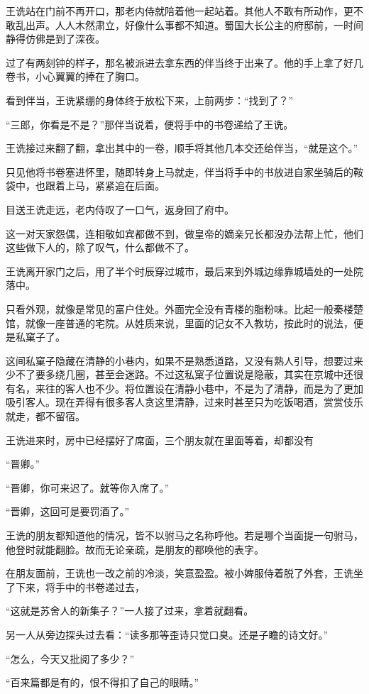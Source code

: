 王诜站在门前不再开口，那老内侍就陪着他一起站着。其他人不敢有所动作，更不敢乱出声。人人木然肃立，好像什么事都不知道。蜀国大长公主的府邸前，一时间静得仿佛是到了深夜。

过了有两刻钟的样子，那名被派进去拿东西的伴当终于出来了。他的手上拿了好几卷书，小心翼翼的捧在了胸口。

看到伴当，王诜紧绷的身体终于放松下来，上前两步：“找到了？”

“三郎，你看是不是？”那伴当说着，便将手中的书卷递给了王诜。

王诜接过来翻了翻，拿出其中的一卷，顺手将其他几本交还给伴当，“就是这个。”

只见他将书卷塞进怀里，随即转身上马就走，伴当将手中的书放进自家坐骑后的鞍袋中，也跟着上马，紧紧追在后面。

目送王诜走远，老内侍叹了一口气，返身回了府中。

这一对天家怨偶，连相敬如宾都做不到，做皇帝的嫡亲兄长都没办法帮上忙，他们这些做下人的，除了叹气，什么都做不了。

王诜离开家门之后，用了半个时辰穿过城市，最后来到外城边缘靠城墙处的一处院落中。

只看外观，就像是常见的富户住处。外面完全没有青楼的脂粉味。比起一般秦楼楚馆，就像一座普通的宅院。从姓质来说，里面的记女不入教坊，按此时的说法，便是私窠子了。

这间私窠子隐藏在清静的小巷内，如果不是熟悉道路，又没有熟人引导，想要过来少不了要多绕几圈，甚至会迷路。不过这私窠子位置说是隐蔽，其实在京城中还很有名，来往的客人也不少。将位置设在清静小巷中，不是为了清静，而是为了更加吸引客人。现在弄得有很多客人贪这里清静，过来时甚至只为吃饭喝酒，赏赏伎乐就走，都不留宿。

王诜进来时，房中已经摆好了席面，三个朋友就在里面等着，却都没有

“晋卿。”

“晋卿，你可来迟了。就等你入席了。”

“晋卿，这回可是要罚酒了。”

王诜的朋友都知道他的情况，皆不以驸马之名称呼他。若是哪个当面提一句驸马，他登时就能翻脸。故而无论亲疏，是朋友的都唤他的表字。

在朋友面前，王诜也一改之前的冷淡，笑意盈盈。被小婢服侍着脱了外套，王诜坐了下来，将手中的书卷递过去，

“这就是苏舍人的新集子？”一人接了过来，拿着就翻看。

另一人从旁边探头过去看：“读多那等歪诗只觉口臭。还是子瞻的诗文好。”

“怎么，今天又批阅了多少？”

“百来篇都是有的，恨不得扣了自己的眼睛。”

